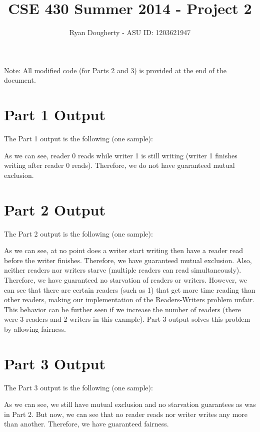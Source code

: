 \documentclass[12pt]{article}
\title{CSE 430 Summer 2014 - Project 2}
\author{Ryan Dougherty - ASU ID: 1203621947}
\date{}                                           %
\begin{document}
\maketitle


Note: All modified code (for Parts 2 and 3) is provided at the end of the document. 

\section{Part 1 Output}
The Part 1 output is the following (one sample):
{\color{blue}

}
As we can see, reader 0 reads while writer 1 is still writing (writer 1 finishes writing after reader 0 reads). Therefore, we do not have guaranteed mutual exclusion.

\section{Part 2 Output}
The Part 2 output is the following (one sample):
{\color{blue}

}
As we can see, at no point does a writer start writing then have a reader read before the writer finishes. Therefore, we have guaranteed mutual exclusion. Also, neither readers nor writers starve (multiple readers can read simultaneously). Therefore, we have guaranteed no starvation of readers or writers. However, we can see that there are certain readers (such as 1) that get more time reading than other readers, making our implementation of the Readers-Writers problem unfair. This behavior can be further seen if we increase the number of readers (there were 3 readers and 2 writers in this example). Part 3 output solves this problem by allowing fairness.

\section{Part 3 Output}
The Part 3 output is the following (one sample):
{\color{blue}

}
As we can see, we still have mutual exclusion and no starvation guarantees as was in Part 2. But now, we can see that no reader reads nor writer writes any more than another. Therefore, we have guaranteed fairness. 
\end{document}

